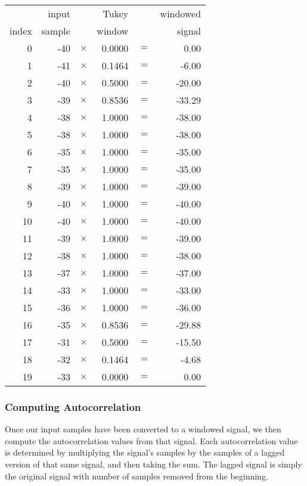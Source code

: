 {
\begin{tabular}{|r|r >{$}c<{$} r >{$}c<{$} r|}
\hline
& input & & Tukey & & windowed \\
index & sample & & window & & signal \\
\hline
0 & -40 & \times & 0.0000 & = & 0.00 \\
1 & -41 & \times & 0.1464 & = & -6.00 \\
2 & -40 & \times & 0.5000 & = & -20.00 \\
3 & -39 & \times & 0.8536 & = & -33.29 \\
4 & -38 & \times & 1.0000 & = & -38.00 \\
5 & -38 & \times & 1.0000 & = & -38.00 \\
6 & -35 & \times & 1.0000 & = & -35.00 \\
7 & -35 & \times & 1.0000 & = & -35.00 \\
8 & -39 & \times & 1.0000 & = & -39.00 \\
9 & -40 & \times & 1.0000 & = & -40.00 \\
10 & -40 & \times & 1.0000 & = & -40.00 \\
11 & -39 & \times & 1.0000 & = & -39.00 \\
12 & -38 & \times & 1.0000 & = & -38.00 \\
13 & -37 & \times & 1.0000 & = & -37.00 \\
14 & -33 & \times & 1.0000 & = & -33.00 \\
15 & -36 & \times & 1.0000 & = & -36.00 \\
16 & -35 & \times & 0.8536 & = & -29.88 \\
17 & -31 & \times & 0.5000 & = & -15.50 \\
18 & -32 & \times & 0.1464 & = & -4.68 \\
19 & -33 & \times & 0.0000 & = & 0.00 \\
\hline
\end{tabular}
}

\pagebreak

\subsubsection{Computing Autocorrelation}

Once our input samples have been converted to a windowed signal,
we then compute the autocorrelation values from that signal.
Each autocorrelation value is determined by multiplying the signal's
samples by the samples of a lagged version of that same signal,
and then taking the sum.
The lagged signal is simply the original signal with  number of
samples removed from the beginning.

